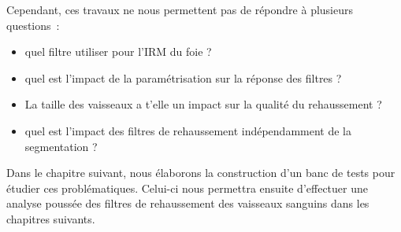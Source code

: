 Cependant, ces travaux ne nous permettent pas de répondre à plusieurs questions~:
\begin{itemize}
\item quel filtre utiliser pour l'IRM du foie ?
\item quel est l'impact de la paramétrisation sur la réponse des filtres ?
\item La taille des vaisseaux a t'elle un impact sur la qualité du rehaussement ?
\item quel est l'impact des filtres de rehaussement indépendamment de la segmentation ?
\end{itemize}
Dans le chapitre suivant, nous élaborons la construction d'un banc de tests pour étudier ces problématiques. Celui-ci nous permettra ensuite d'effectuer une analyse poussée des filtres de rehaussement des vaisseaux sanguins dans les chapitres suivants.








